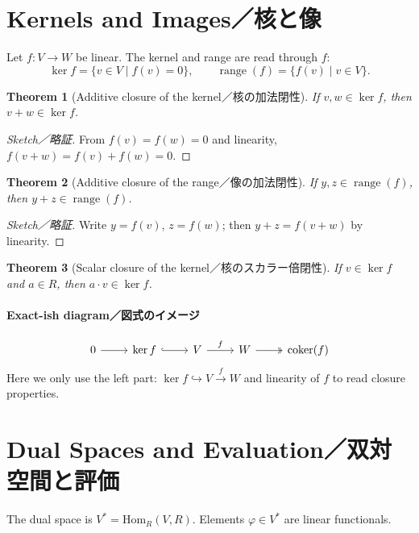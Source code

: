 \documentclass[11pt]{article}
\theoremstyle{definition}
\theoremstyle{plain}
\newtheorem{theorem}{Theorem}
\theoremstyle{remark}
\begin{document}
\section{Kernels and Images／核と像}

Let $f:V\to W$ be linear. The kernel and range are read through $f$:
\[
 \ker f = \{v\in V\mid f(v)=0\},\qquad \operatorname{range}(f)=\{f(v)\mid v\in V\}.
\]

\begin{theorem}[Additive closure of the kernel／核の加法閉性]
If $v,w\in\ker f$, then $v+w\in\ker f$.
\end{theorem}

\begin{proof}[Sketch／略証]
From $f(v)=f(w)=0$ and linearity, $f(v+w)=f(v)+f(w)=0$.
\end{proof}

\begin{theorem}[Additive closure of the range／像の加法閉性]
If $y,z\in\operatorname{range}(f)$, then $y+z\in\operatorname{range}(f)$.
\end{theorem}

\begin{proof}[Sketch／略証]
Write $y=f(v)$, $z=f(w)$; then $y+z=f(v+w)$ by linearity.
\end{proof}

\begin{theorem}[Scalar closure of the kernel／核のスカラー倍閉性]
If $v\in\ker f$ and $a\in R$, then $a\cdot v\in\ker f$.
\end{theorem}

\paragraph{Exact-ish diagram／図式のイメージ}
\[
\begin{tikzcd}
0 \arrow[r] & \ker f \arrow[r, hook] & V \arrow[r, "f"] & W \arrow[r, two heads] & \operatorname{coker}(f)
\end{tikzcd}
\]
Here we only use the left part: $\ker f\hookrightarrow V \xrightarrow{\ f\ } W$ and linearity
of $f$ to read closure properties.

\section{Dual Spaces and Evaluation／双対空間と評価}

The dual space is $V^* = \mathrm{Hom}_R(V,R)$. Elements $\varphi\in V^*$ are linear functionals.
\end{document}
